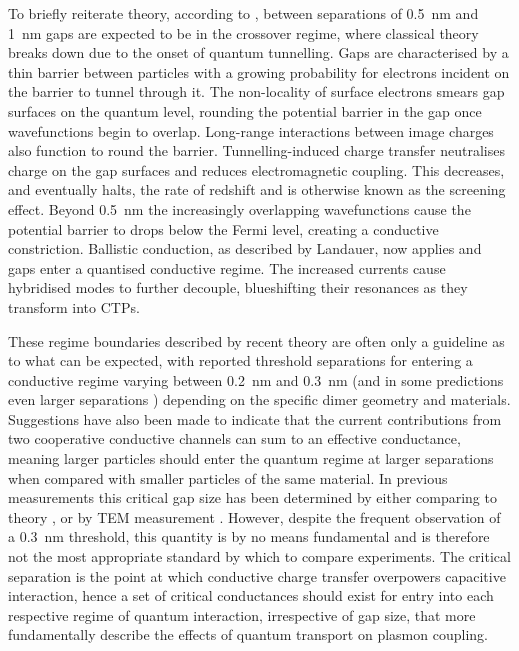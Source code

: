 \documentclass[a4paper]{article}
\begin{document}
To briefly reiterate theory, according to \cite{zuloaga2009}, between separations of \SI{0.5}{nm} and \SI{1}{nm} gaps are expected to be in the crossover regime, where classical theory breaks down due to the onset of quantum tunnelling. Gaps are characterised by a thin barrier between particles with a growing probability for electrons incident on the barrier to tunnel through it. The non-locality of surface electrons smears gap surfaces on the quantum level, rounding the potential barrier in the gap once wavefunctions begin to overlap. Long-range interactions between image charges also function to round the barrier. Tunnelling-induced charge transfer neutralises charge on the gap surfaces and reduces electromagnetic coupling. This decreases, and eventually halts, the rate of redshift and is otherwise known as the screening effect. Beyond \SI{0.5}{nm} the increasingly overlapping wavefunctions cause the potential barrier to drops below the Fermi level, creating a conductive constriction. Ballistic conduction, as described by Landauer, now applies and gaps enter a quantised conductive regime. The increased currents cause hybridised modes to further decouple, blueshifting their resonances as they transform into CTPs.

These regime boundaries described by recent theory are often only a guideline as to what can be expected, with reported threshold separations for entering a conductive regime varying between \SI{0.2}{nm} \cite{zuloaga2009} and \SI{0.3}{nm} \cite{esteban2012, savage2012, scholl2013, esteban2015} (and in some predictions even larger separations \cite{barbry2015}) depending on the specific dimer geometry and materials. Suggestions have also been made to indicate that the current contributions from two cooperative conductive channels can sum to an effective conductance, meaning larger particles should enter the quantum regime at larger separations when compared with smaller particles of the same material. In previous measurements this critical gap size has been determined by either comparing to theory \cite{savage2012}, or by TEM measurement \cite{scholl2013}. However, despite the frequent observation of a \SI{0.3}{nm} threshold, this quantity is by no means fundamental and is therefore not the most appropriate standard by which to compare experiments. The critical separation is the point at which conductive charge transfer overpowers capacitive interaction, hence a set of critical conductances should exist for entry into each respective regime of quantum interaction, irrespective of gap size, that more fundamentally describe the effects of quantum transport on plasmon coupling.
\end{document}
